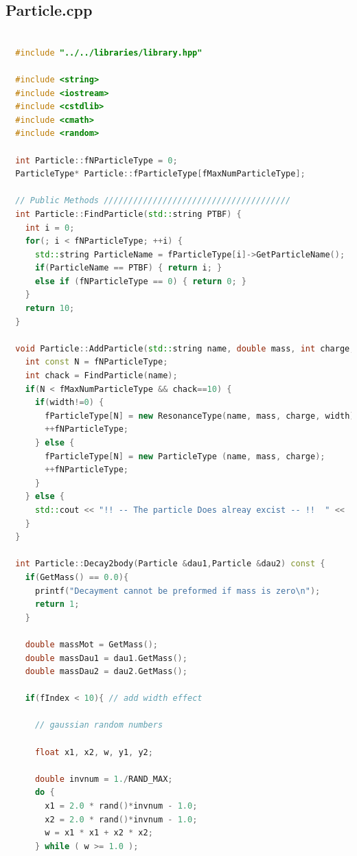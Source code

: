 \documentclass[a4paper, 11pt]{article}
\begin{document}
      \subsection{Particle.cpp}
        \begin{lstlisting}[language=c++, style=code]

  #include "../../libraries/library.hpp"

  #include <string>
  #include <iostream>
  #include <cstdlib>
  #include <cmath>
  #include <random>

  int Particle::fNParticleType = 0;
  ParticleType* Particle::fParticleType[fMaxNumParticleType];

  // Public Methods //////////////////////////////////////
  int Particle::FindParticle(std::string PTBF) {
    int i = 0;
    for(; i < fNParticleType; ++i) {
      std::string ParticleName = fParticleType[i]->GetParticleName();
      if(ParticleName == PTBF) { return i; }
      else if (fNParticleType == 0) { return 0; }
    }
    return 10;
  }

  void Particle::AddParticle(std::string name, double mass, int charge, double width) {
    int const N = fNParticleType;
    int chack = FindParticle(name);
    if(N < fMaxNumParticleType && chack==10) {
      if(width!=0) {
        fParticleType[N] = new ResonanceType(name, mass, charge, width);
        ++fNParticleType;
      } else {
        fParticleType[N] = new ParticleType (name, mass, charge);
        ++fNParticleType;
      }
    } else {
      std::cout << "!! -- The particle Does alreay excist -- !!  " << '\n';
    }
  }

  int Particle::Decay2body(Particle &dau1,Particle &dau2) const {
    if(GetMass() == 0.0){
      printf("Decayment cannot be preformed if mass is zero\n");
      return 1;
    }

    double massMot = GetMass();
    double massDau1 = dau1.GetMass();
    double massDau2 = dau2.GetMass();

    if(fIndex < 10){ // add width effect

      // gaussian random numbers

      float x1, x2, w, y1, y2;

      double invnum = 1./RAND_MAX;
      do {
        x1 = 2.0 * rand()*invnum - 1.0;
        x2 = 2.0 * rand()*invnum - 1.0;
        w = x1 * x1 + x2 * x2;
      } while ( w >= 1.0 );


\end{lstlisting}
\end{document}
